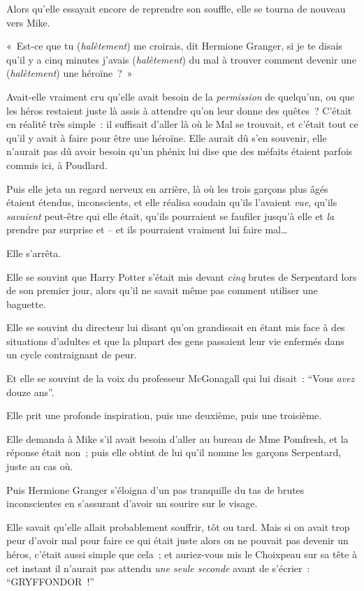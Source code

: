 Alors qu'elle essayait encore de reprendre son souffle, elle se tourna de nouveau vers Mike.

«~Est-ce que tu (\emph{halètement}) me croirais, dit Hermione Granger, si je te disais qu'il y a cinq minutes j'avais (\emph{halètement}) du mal à trouver comment devenir une (\emph{halètement}) une héroïne~?~»

Avait-elle vraiment cru qu'elle avait besoin de la \emph{permission} de quelqu'un, ou que les héros restaient juste là assis à attendre qu'on leur donne des quêtes~? C'était en réalité très simple~: il suffisait d'aller là où le Mal se trouvait, et c'était tout ce qu'il y avait à faire pour être une héroïne. Elle aurait dû s'en souvenir, elle n'aurait pas dû avoir besoin qu'un phénix lui dise que des méfaits étaient parfois commis ici, à Poudlard.

Puis elle jeta un regard nerveux en arrière, là où les trois garçons plus âgés étaient étendus, inconscients, et elle réalisa soudain qu'ils l'avaient \emph{vue}, qu'ils \emph{savaient} peut-être qui elle était, qu'ils pourraient se faufiler jusqu'à elle et \emph{la} prendre par surprise et -- et ils pourraient vraiment lui faire mal…

Elle s'arrêta.

Elle se souvint que Harry Potter s'était mis devant \emph{cinq} brutes de Serpentard lors de son premier jour, alors qu'il ne savait même pas comment utiliser une baguette.

Elle se souvint du directeur lui disant qu'on grandissait en étant mis face à des situations d'adultes et que la plupart des gens passaient leur vie enfermés dans un cycle contraignant de peur.

Et elle se souvint de la voix du professeur McGonagall qui lui disait~: “Vous \emph{avez} douze ans”.

Elle prit une profonde inspiration, puis une deuxième, puis une troisième.

Elle demanda à Mike s'il avait besoin d'aller au bureau de Mme Pomfresh, et la réponse était non~; puis elle obtint de lui qu'il nomme les garçons Serpentard, juste au cas où.

Puis Hermione Granger s'éloigna d'un pas tranquille du tas de brutes inconscientes en s'assurant d'avoir un sourire sur le visage.

Elle savait qu'elle allait probablement souffrir, tôt ou tard. Mais si on avait trop peur d'avoir mal pour faire ce qui était juste alors on ne pouvait pas devenir un héros, c'était aussi simple que cela~; et auriez-vous mis le Choixpeau sur sa tête à cet instant il n'aurait pas attendu \emph{une seule seconde} avant de s'écrier~: “GRYFFONDOR~!”

